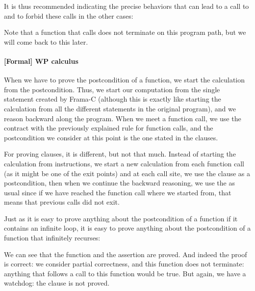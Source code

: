 



It is thus recommended indicating the precise behaviors that can lead
to a call to  and to forbid these calls in the
other cases:




Note that a function that calls  does not terminate on this
program path, but we will come back to this later.


\paragraph*{[Formal] WP calculus}


When we have to prove the postcondition of a function, we start the calculation
from the postcondition. Thus, we start our computation from the single
 statement created by Frama-C (although this is exactly like
starting the calculation from all the different  statements in the
original program), and we reason backward along the program. When we meet a
function call, we use the contract with the previously explained rule for
function calls, and the postcondition we consider at this point is
the one stated in the  clauses.


For proving  clauses, it is different, but not that much.
Instead of starting the calculation from  instructions, we start
a new calculation from each function call (as it might be one of the exit points)
and at each call site, we use the  clause as a postcondition, then
when we continue the backward reasoning, we use the  as
usual since if we have reached the function call where we started from, that
means that previous calls did not exit.




Just as it is easy to prove anything about the postcondition of a function if it
contains an infinite loop, it is easy to prove anything about the postcondition
of a function that infinitely recurses:






We can see that the function and the assertion are proved. And indeed the
proof is correct: we consider partial correctness, and this function
does not terminate: anything that follows a call to this function would
be true. But again, we have a watchdog: the  clause is
not proved.


